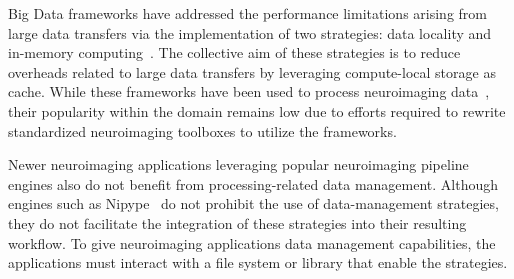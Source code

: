 \documentclass[pdflatex,sn-mathphys-num]{sn-jnl}
\theoremstyle{thmstyleone}%
\theoremstyle{thmstyletwo}%
\theoremstyle{thmstylethree}%
\begin{document}
    Big Data frameworks have addressed the performance limitations arising from large data transfers via the
    implementation of two strategies: data locality and in-memory computing~\cite{zaharia2016apache, rocklin2015dask}.
    The collective aim of these strategies is to reduce overheads related to large data
    transfers by leveraging compute-local storage as cache.
    While these frameworks have been used
    to process neuroimaging data~\cite{rokem2021pan,thunder,boubela2016big},
    their popularity within the domain remains low due to efforts required to
    rewrite standardized neuroimaging toolboxes to utilize the frameworks.
    
    Newer neuroimaging applications leveraging popular neuroimaging pipeline engines
    also do not benefit from processing-related data management.
    Although engines such as Nipype~\cite{nipype}
    do not prohibit the use of data-management
    strategies, they do not facilitate the integration of these strategies into
    their resulting workflow. To give
    neuroimaging applications data management capabilities, the applications
    must interact with a file system or library that enable the strategies.



    
    
    
\end{document}
